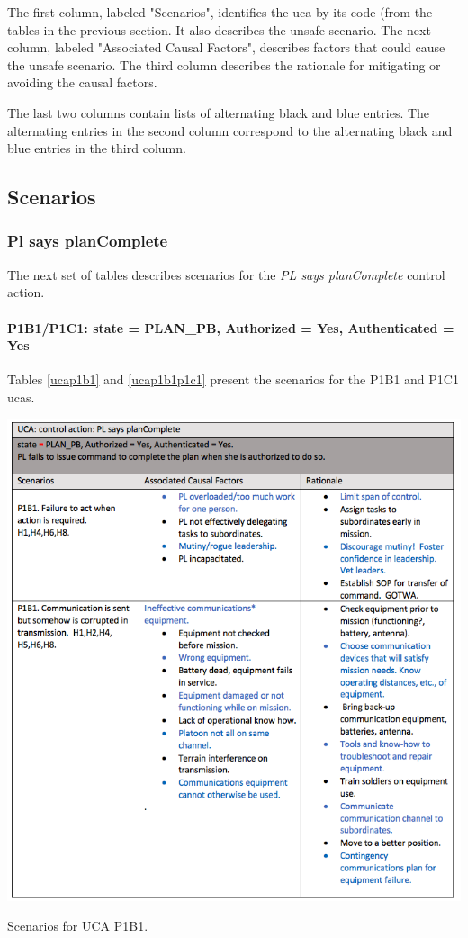 \documentclass[../../main/main.tex]{subfiles}
\begin{document}
The first column, labeled "Scenarios", identifies the \gls{uca} by its code (from the tables in  the previous section.  It also describes the unsafe scenario.  The next column, labeled "Associated Causal Factors", describes factors that could cause the unsafe scenario.  The third column describes the rationale for mitigating or avoiding the causal factors.  

The last two columns contain lists of alternating black and blue entries.  The alternating entries in the second column correspond to the alternating black and blue entries in the third column.  

\subsection{Scenarios}
\clearpage

\subsubsection*{Pl says planComplete}
The next set of tables describes scenarios for the \textit{PL says planComplete} control action.
\paragraph*{P1B1/P1C1: state = PLAN_PB, Authorized = Yes, Authenticated = Yes}
Tables \ref{ucap1b1} and \ref{ucap1b1p1c1} present the scenarios for the P1B1 and P1C1 \glspl{uca}.

\begin{table}[ht!]
\begin{center}
\includegraphics[width=\linewidth]{../figures/ucap1b1}
\caption{Scenarios for UCA P1B1.}
\label{ucap1b1}
\end{center}
\end{table}
\clearpage
\end{document}
